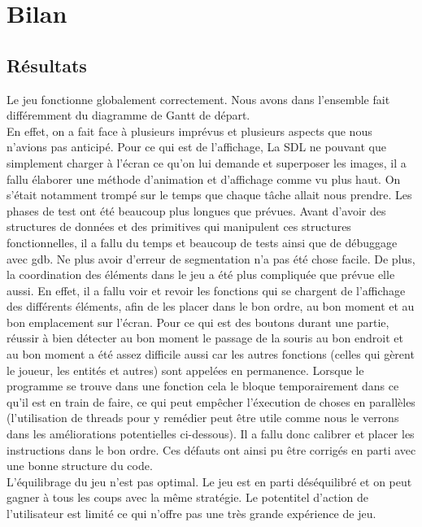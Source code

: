 \documentclass[a4paper,11pt]{article}
\begin{document}
\section{Bilan}
\subsection{Résultats}

Le jeu fonctionne globalement correctement. Nous avons dans l'ensemble fait différemment du diagramme de Gantt de départ.\\
En effet, on a fait face à plusieurs imprévus et plusieurs aspects que nous n'avions pas anticipé. Pour ce qui est de l'affichage,
La SDL ne pouvant que simplement charger à l'écran ce qu'on lui demande et superposer les images, il a fallu élaborer une méthode
d'animation et d'affichage comme vu plus haut. On s'était notamment trompé sur le temps que chaque tâche allait nous prendre. Les phases
de test ont été beaucoup plus longues que prévues. Avant d'avoir des structures de données et des primitives qui manipulent ces structures
fonctionnelles, il a fallu du temps et beaucoup de tests ainsi que de débuggage avec gdb. Ne plus avoir d'erreur de segmentation n'a pas été chose facile.
De plus, la coordination des éléments dans le jeu a été plus compliquée que prévue elle aussi.
En effet, il a fallu voir et revoir les fonctions qui se chargent de l'affichage des différents éléments, afin de les placer
dans le bon ordre, au bon moment et au bon emplacement sur l'écran.
Pour ce qui est des boutons durant une partie, réussir à bien détecter au bon moment le passage de la souris 
au bon endroit et au bon moment a été assez difficile aussi car les autres fonctions (celles qui gèrent le joueur, les entités et autres) sont appelées
en permanence. Lorsque le programme se trouve dans une fonction cela le bloque temporairement dans ce qu'il est en train de faire,
ce qui peut empêcher l'éxecution de choses en parallèles (l'utilisation de threads pour y remédier peut être utile comme nous le verrons dans les améliorations
potentielles ci-dessous). Il a fallu donc calibrer et placer les instructions dans le bon ordre. Ces défauts ont ainsi pu être corrigés en parti avec
une bonne structure du code. \\
L'équilibrage du jeu n'est pas optimal. Le jeu est en parti déséquilibré et on peut gagner à tous les coups avec
la même stratégie. Le potentitel d'action de l'utilisateur est limité ce qui n'offre pas une très grande expérience de jeu.\\\\\\\\\\\\
\end{document}
